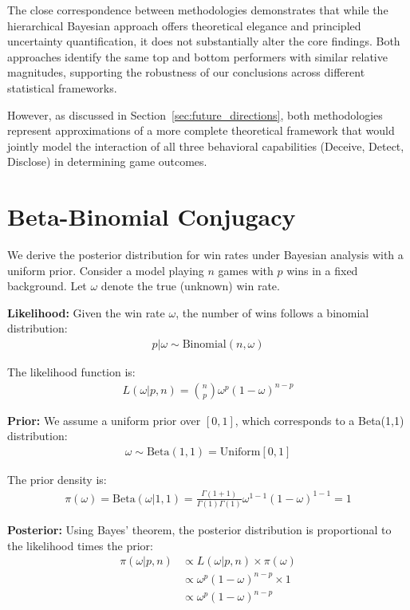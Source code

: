 \documentclass{article}
\begin{document}
The close correspondence between methodologies demonstrates that while the hierarchical Bayesian approach offers theoretical elegance and principled uncertainty quantification, it does not substantially alter the core findings. Both approaches identify the same top and bottom performers with similar relative magnitudes, supporting the robustness of our conclusions across different statistical frameworks.

However, as discussed in Section~\ref{sec:future_directions}, both methodologies represent approximations of a more complete theoretical framework that would jointly model the interaction of all three behavioral capabilities (Deceive, Detect, Disclose) in determining game outcomes.

\section{Beta-Binomial Conjugacy}
\label{appendix:beta_binomial}

We derive the posterior distribution for win rates under Bayesian analysis with a uniform prior. Consider a model playing $n$ games with $p$ wins in a fixed background. Let $\omega$ denote the true (unknown) win rate.

\textbf{Likelihood:} Given the win rate $\omega$, the number of wins follows a binomial distribution:
\begin{align}
p | \omega \sim \text{Binomial}(n, \omega)
\end{align}

The likelihood function is:
\begin{align}
L(\omega | p, n) = \binom{n}{p} \omega^p (1-\omega)^{n-p}
\end{align}

\textbf{Prior:} We assume a uniform prior over $[0,1]$, which corresponds to a Beta(1,1) distribution:
\begin{align}
\omega \sim \text{Beta}(1, 1) = \text{Uniform}[0,1]
\end{align}

The prior density is:
\begin{align}
\pi(\omega) = \text{Beta}(\omega | 1, 1) = \frac{\Gamma(1+1)}{\Gamma(1)\Gamma(1)} \omega^{1-1}(1-\omega)^{1-1} = 1
\end{align}

\textbf{Posterior:} Using Bayes' theorem, the posterior distribution is proportional to the likelihood times the prior:
\begin{align}
\pi(\omega | p, n) &\propto L(\omega | p, n) \times \pi(\omega)\\
&\propto \omega^p (1-\omega)^{n-p} \times 1\\
&\propto \omega^p (1-\omega)^{n-p}
\end{align}
\end{document}
